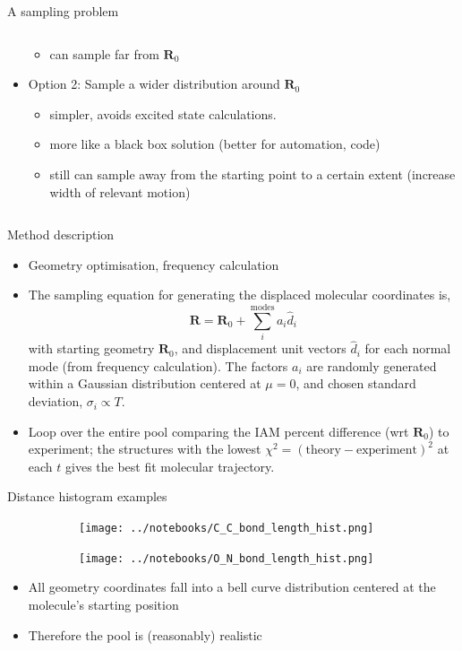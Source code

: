 \documentclass{beamer}
\begin{document}
\begin{frame}{A sampling problem}
\begin{columns}
\begin{column}{0.5\textwidth}
\begin{itemize}
				\begin{itemize}
					\item can sample far from $\textbf{R}_0$
				\end{itemize}
				\item Option 2: Sample a wider distribution around $\textbf{R}_0$
				\begin{itemize}
					\item simpler, avoids excited state calculations. 
					\item more like a black box solution (better for automation, code)
					\item still can sample away from the starting point to a certain extent (increase width of relevant motion)
				\end{itemize}
			\end{itemize}
		\end{column}	
	\end{columns}
\end{frame}

\begin{frame}{Method description}
	\begin{itemize}
	\item Geometry optimisation, frequency calculation
	\item	The sampling equation for generating the displaced molecular coordinates is,
	\[
	\textbf{R} = \textbf{R}_0 + \sum_i^{\textrm{modes}} a_i\hat{d}_i
	\]
	with starting geometry $\textbf{R}_0$, and displacement unit vectors $\hat{d}_i$ for each normal mode (from frequency calculation).  The factors $a_i$ are randomly generated within a Gaussian distribution centered at $\mu=0$, and chosen standard deviation, $\sigma_i \propto T$.

	\item Loop over the entire pool comparing the IAM percent difference (wrt $\textbf{R}_0$) to experiment; the structures with the lowest $\chi^2=(\textrm{theory}-\textrm{experiment})^2$ at each $t$ gives the best fit molecular trajectory.	
	\end{itemize}
\end{frame}

\begin{frame}{Distance histogram examples}
	\begin{figure}
		\centering
		\begin{subfigure}[b]{0.45\textwidth}
			\texttt{[image: ../notebooks/C\_C\_bond\_length\_hist.png]}
		\end{subfigure}
		\begin{subfigure}[b]{0.45\textwidth}
			\texttt{[image: ../notebooks/O\_N\_bond\_length\_hist.png]}
		\end{subfigure}
	\end{figure}
	\begin{itemize}
		\item All geometry coordinates fall into a bell curve distribution centered at the molecule's starting position
		\item Therefore the pool is (reasonably) realistic 
	\end{itemize}
\end{frame}
\end{document}
